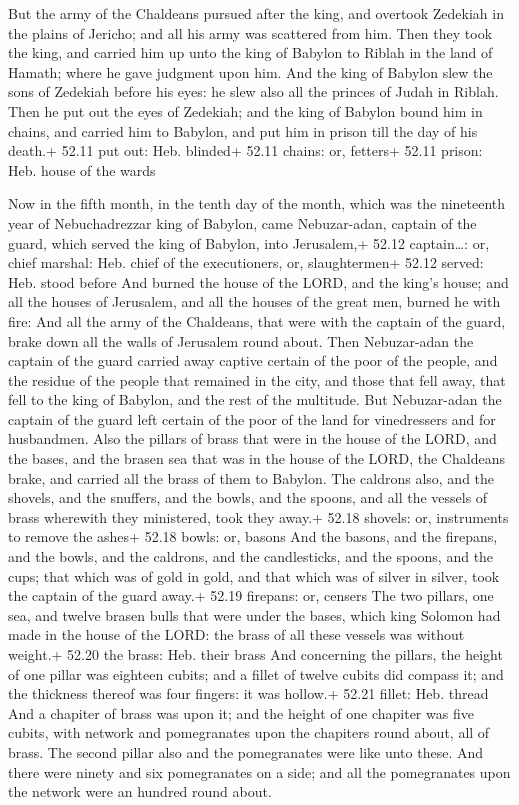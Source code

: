  But the army of the Chaldeans pursued after the king, and
overtook Zedekiah in the plains of Jericho; and all his army was
scattered from him.  Then they took the king, and carried
him up unto the king of Babylon to Riblah in the land of Hamath; where
he gave judgment upon him.  And the king of Babylon slew
the sons of Zedekiah before his eyes: he slew also all the princes of
Judah in Riblah.  Then he put out the eyes of Zedekiah; and
the king of Babylon bound him in chains, and carried him to Babylon, and
put him in prison till the day of his death.+ 52.11 put out: Heb.
blinded+ 52.11 chains: or, fetters+ 52.11 prison: Heb. house of the
wards

 Now in the fifth month, in the tenth day of the month,
which was the nineteenth year of Nebuchadrezzar king of Babylon, came
Nebuzar-adan, captain of the guard, which served the king of Babylon,
into Jerusalem,+ 52.12 captain\ldots: or, chief marshal: Heb. chief of
the executioners, or, slaughtermen+ 52.12 served: Heb. stood before
 And burned the house of the LORD, and the king's house;
and all the houses of Jerusalem, and all the houses of the great men,
burned he with fire:  And all the army of the Chaldeans,
that were with the captain of the guard, brake down all the walls of
Jerusalem round about.  Then Nebuzar-adan the captain of
the guard carried away captive certain of the poor of the people, and
the residue of the people that remained in the city, and those that fell
away, that fell to the king of Babylon, and the rest of the multitude.
 But Nebuzar-adan the captain of the guard left certain of
the poor of the land for vinedressers and for husbandmen. 
Also the pillars of brass that were in the house of the LORD, and the
bases, and the brasen sea that was in the house of the LORD, the
Chaldeans brake, and carried all the brass of them to Babylon.
 The caldrons also, and the shovels, and the snuffers, and
the bowls, and the spoons, and all the vessels of brass wherewith they
ministered, took they away.+ 52.18 shovels: or, instruments to remove
the ashes+ 52.18 bowls: or, basons  And the basons, and the
firepans, and the bowls, and the caldrons, and the candlesticks, and the
spoons, and the cups; that which was of gold in gold, and that which was
of silver in silver, took the captain of the guard away.+ 52.19
firepans: or, censers  The two pillars, one sea, and twelve
brasen bulls that were under the bases, which king Solomon had made in
the house of the LORD: the brass of all these vessels was without
weight.+ 52.20 the brass: Heb. their brass  And concerning
the pillars, the height of one pillar was eighteen cubits; and a fillet
of twelve cubits did compass it; and the thickness thereof was four
fingers: it was hollow.+ 52.21 fillet: Heb. thread  And a
chapiter of brass was upon it; and the height of one chapiter was five
cubits, with network and pomegranates upon the chapiters round about,
all of brass. The second pillar also and the pomegranates were like unto
these.  And there were ninety and six pomegranates on a
side; and all the pomegranates upon the network were an hundred round
about.

